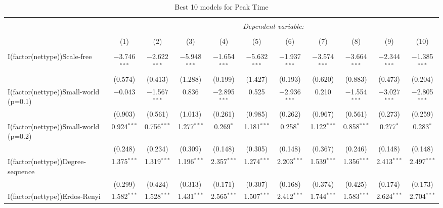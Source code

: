
\begin{table}[!htbp] \centering 
  \caption{Best 10 models for Peak Time} 
  \label{tab:best_models_peak_time} 
\begin{tabular}{@{\extracolsep{5pt}}lcccccccccc} 
\\[-1.8ex]\hline 
\hline \\[-1.8ex] 
 & \multicolumn{10}{c}{\textit{Dependent variable:}} \\ 
\cline{2-11} 
\\[-1.8ex] & (1) & (2) & (3) & (4) & (5) & (6) & (7) & (8) & (9) & (10)\\ 
\hline \\[-1.8ex] 
 I(factor(nettype))Scale-free & $-$3.746$^{***}$ & $-$2.622$^{***}$ & $-$5.948$^{***}$ & $-$1.654$^{***}$ & $-$5.632$^{***}$ & $-$1.937$^{***}$ & $-$3.574$^{***}$ & $-$3.664$^{***}$ & $-$2.344$^{***}$ & $-$1.385$^{***}$ \\ 
  & (0.574) & (0.413) & (1.288) & (0.199) & (1.427) & (0.193) & (0.620) & (0.883) & (0.473) & (0.204) \\ 
  I(factor(nettype))Small-world (p=0.1) & $-$0.043 & $-$1.567$^{***}$ & 0.836 & $-$2.895$^{***}$ & 0.525 & $-$2.936$^{***}$ & 0.210 & $-$1.554$^{***}$ & $-$3.027$^{***}$ & $-$2.805$^{***}$ \\ 
  & (0.903) & (0.561) & (1.013) & (0.261) & (0.985) & (0.262) & (0.967) & (0.561) & (0.273) & (0.259) \\ 
  I(factor(nettype))Small-world (p=0.2) & 0.924$^{***}$ & 0.756$^{***}$ & 1.277$^{***}$ & 0.269$^{*}$ & 1.181$^{***}$ & 0.258$^{*}$ & 1.122$^{***}$ & 0.858$^{***}$ & 0.277$^{*}$ & 0.283$^{*}$ \\ 
  & (0.248) & (0.234) & (0.309) & (0.148) & (0.305) & (0.148) & (0.367) & (0.246) & (0.148) & (0.148) \\ 
  I(factor(nettype))Degree-sequence & 1.375$^{***}$ & 1.319$^{***}$ & 1.196$^{***}$ & 2.357$^{***}$ & 1.274$^{***}$ & 2.203$^{***}$ & 1.539$^{***}$ & 1.356$^{***}$ & 2.413$^{***}$ & 2.497$^{***}$ \\ 
  & (0.299) & (0.424) & (0.313) & (0.171) & (0.307) & (0.168) & (0.374) & (0.425) & (0.174) & (0.173) \\ 
  I(factor(nettype))Erdos-Renyi & 1.582$^{***}$ & 1.528$^{***}$ & 1.431$^{***}$ & 2.565$^{***}$ & 1.507$^{***}$ & 2.412$^{***}$ & 1.744$^{***}$ & 1.583$^{***}$ & 2.624$^{***}$ & 2.704$^{***}$ \\ 

\end{tabular}
\end{table}
